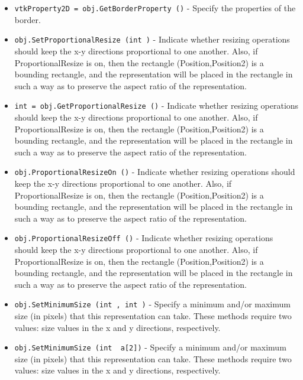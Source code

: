 \begin{itemize}
\item  \verb|vtkProperty2D = obj.GetBorderProperty ()| -  Specify the properties of the border.

\item  \verb|obj.SetProportionalResize (int )| -  Indicate whether resizing operations should keep the x-y directions
 proportional to one another. Also, if ProportionalResize is on, then
 the rectangle (Position,Position2) is a bounding rectangle, and the
 representation will be placed in the rectangle in such a way as to 
 preserve the aspect ratio of the representation.

\item  \verb|int = obj.GetProportionalResize ()| -  Indicate whether resizing operations should keep the x-y directions
 proportional to one another. Also, if ProportionalResize is on, then
 the rectangle (Position,Position2) is a bounding rectangle, and the
 representation will be placed in the rectangle in such a way as to 
 preserve the aspect ratio of the representation.

\item  \verb|obj.ProportionalResizeOn ()| -  Indicate whether resizing operations should keep the x-y directions
 proportional to one another. Also, if ProportionalResize is on, then
 the rectangle (Position,Position2) is a bounding rectangle, and the
 representation will be placed in the rectangle in such a way as to 
 preserve the aspect ratio of the representation.

\item  \verb|obj.ProportionalResizeOff ()| -  Indicate whether resizing operations should keep the x-y directions
 proportional to one another. Also, if ProportionalResize is on, then
 the rectangle (Position,Position2) is a bounding rectangle, and the
 representation will be placed in the rectangle in such a way as to 
 preserve the aspect ratio of the representation.

\item  \verb|obj.SetMinimumSize (int , int )| -  Specify a minimum and/or maximum size (in pixels) that this representation
 can take. These methods require two values: size values in the x and y
 directions, respectively.

\item  \verb|obj.SetMinimumSize (int  a[2])| -  Specify a minimum and/or maximum size (in pixels) that this representation
 can take. These methods require two values: size values in the x and y
 directions, respectively.


\end{itemize}

